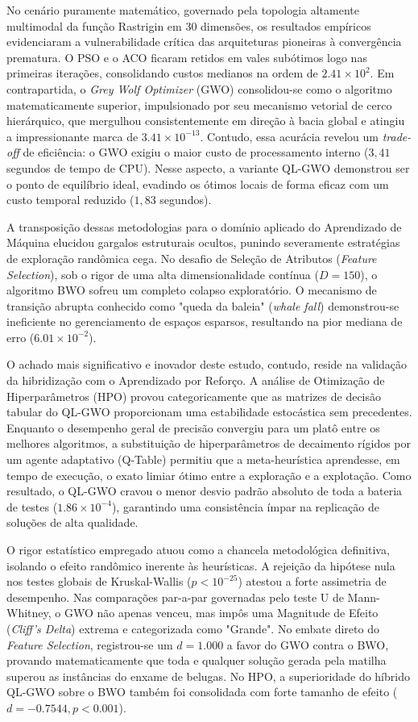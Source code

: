 \documentclass[12pt, a4paper, oneside]{report}
\begin{document}
No cenário puramente matemático, governado pela topologia altamente multimodal da função Rastrigin em 30 dimensões, os resultados empíricos evidenciaram a vulnerabilidade crítica das arquiteturas pioneiras à convergência prematura. O PSO e o ACO ficaram retidos em vales subótimos logo nas primeiras iterações, consolidando custos medianos na ordem de $2.41 \times 10^2$. Em contrapartida, o \textit{Grey Wolf Optimizer} (GWO) consolidou-se como o algoritmo matematicamente superior, impulsionado por seu mecanismo vetorial de cerco hierárquico, que mergulhou consistentemente em direção à bacia global e atingiu a impressionante marca de $3.41 \times 10^{-13}$. Contudo, essa acurácia revelou um \textit{trade-off} de eficiência: o GWO exigiu o maior custo de processamento interno ($3,41$ segundos de tempo de CPU). Nesse aspecto, a variante QL-GWO demonstrou ser o ponto de equilíbrio ideal, evadindo os ótimos locais de forma eficaz com um custo temporal reduzido ($1,83$ segundos).

A transposição dessas metodologias para o domínio aplicado do Aprendizado de Máquina elucidou gargalos estruturais ocultos, punindo severamente estratégias de exploração randômica cega. No desafio de Seleção de Atributos (\textit{Feature Selection}), sob o rigor de uma alta dimensionalidade contínua ($D=150$), o algoritmo BWO sofreu um completo colapso exploratório. O mecanismo de transição abrupta conhecido como "queda da baleia" (\textit{whale fall}) demonstrou-se ineficiente no gerenciamento de espaços esparsos, resultando na pior mediana de erro ($6.01 \times 10^{-2}$). 

O achado mais significativo e inovador deste estudo, contudo, reside na validação da hibridização com o Aprendizado por Reforço. A análise de Otimização de Hiperparâmetros (HPO) provou categoricamente que as matrizes de decisão tabular do QL-GWO proporcionam uma estabilidade estocástica sem precedentes. Enquanto o desempenho geral de precisão convergiu para um platô entre os melhores algoritmos, a substituição de hiperparâmetros de decaimento rígidos por um agente adaptativo (Q-Table) permitiu que a meta-heurística aprendesse, em tempo de execução, o exato limiar ótimo entre a exploração e a explotação. Como resultado, o QL-GWO cravou o menor desvio padrão absoluto de toda a bateria de testes ($1.86 \times 10^{-4}$), garantindo uma consistência ímpar na replicação de soluções de alta qualidade.

O rigor estatístico empregado atuou como a chancela metodológica definitiva, isolando o efeito randômico inerente às heurísticas. A rejeição da hipótese nula nos testes globais de Kruskal-Wallis ($p < 10^{-25}$) atestou a forte assimetria de desempenho. Nas comparações par-a-par governadas pelo teste U de Mann-Whitney, o GWO não apenas venceu, mas impôs uma Magnitude de Efeito (\textit{Cliff's Delta}) extrema e categorizada como "Grande". No embate direto do \textit{Feature Selection}, registrou-se um $d=1.000$ a favor do GWO contra o BWO, provando matematicamente que toda e qualquer solução gerada pela matilha superou as instâncias do enxame de belugas. No HPO, a superioridade do híbrido QL-GWO sobre o BWO também foi consolidada com forte tamanho de efeito ($d=-0.7544, p < 0.001$).
\end{document}
